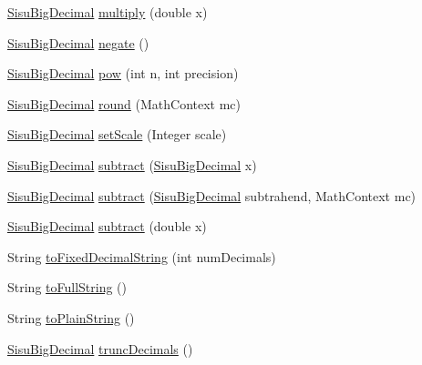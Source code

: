 \begin{DoxyCompactItemize}
\item 
\hyperlink{classcom_1_1aarrelaakso_1_1drawl_1_1_sisu_big_decimal}{Sisu\+Big\+Decimal} \hyperlink{classcom_1_1aarrelaakso_1_1drawl_1_1_sisu_big_decimal_a629f43082e518f55326ca0efcffad3b5}{multiply} (double x)
\item 
\hyperlink{classcom_1_1aarrelaakso_1_1drawl_1_1_sisu_big_decimal}{Sisu\+Big\+Decimal} \hyperlink{classcom_1_1aarrelaakso_1_1drawl_1_1_sisu_big_decimal_a2d82668c01a8ec2b0b79c2a6cd63253c}{negate} ()
\item 
\hyperlink{classcom_1_1aarrelaakso_1_1drawl_1_1_sisu_big_decimal}{Sisu\+Big\+Decimal} \hyperlink{classcom_1_1aarrelaakso_1_1drawl_1_1_sisu_big_decimal_aa3be41b7881201bb4184ef30b8ee4ad9}{pow} (int n, int precision)
\item 
\hyperlink{classcom_1_1aarrelaakso_1_1drawl_1_1_sisu_big_decimal}{Sisu\+Big\+Decimal} \hyperlink{classcom_1_1aarrelaakso_1_1drawl_1_1_sisu_big_decimal_a5d192b65bffd1955bb670588ece9ba0e}{round} (Math\+Context mc)
\item 
\hyperlink{classcom_1_1aarrelaakso_1_1drawl_1_1_sisu_big_decimal}{Sisu\+Big\+Decimal} \hyperlink{classcom_1_1aarrelaakso_1_1drawl_1_1_sisu_big_decimal_a28eb72a8179d226e5bcfdbc5c2e103bf}{set\+Scale} (Integer scale)
\item 
\hyperlink{classcom_1_1aarrelaakso_1_1drawl_1_1_sisu_big_decimal}{Sisu\+Big\+Decimal} \hyperlink{classcom_1_1aarrelaakso_1_1drawl_1_1_sisu_big_decimal_a44ef5723298dfa0e8fc62506fdc059cd}{subtract} (\hyperlink{classcom_1_1aarrelaakso_1_1drawl_1_1_sisu_big_decimal}{Sisu\+Big\+Decimal} x)
\item 
\hyperlink{classcom_1_1aarrelaakso_1_1drawl_1_1_sisu_big_decimal}{Sisu\+Big\+Decimal} \hyperlink{classcom_1_1aarrelaakso_1_1drawl_1_1_sisu_big_decimal_a8a237e36134bf0cdb87c3b53b3aaa9cc}{subtract} (\hyperlink{classcom_1_1aarrelaakso_1_1drawl_1_1_sisu_big_decimal}{Sisu\+Big\+Decimal} subtrahend, Math\+Context mc)
\item 
\hyperlink{classcom_1_1aarrelaakso_1_1drawl_1_1_sisu_big_decimal}{Sisu\+Big\+Decimal} \hyperlink{classcom_1_1aarrelaakso_1_1drawl_1_1_sisu_big_decimal_abde4af9e4686abbbdb1539505f7223ae}{subtract} (double x)
\item 
String \hyperlink{classcom_1_1aarrelaakso_1_1drawl_1_1_sisu_big_decimal_aa50e4eab549ecda56977c2480674055b}{to\+Fixed\+Decimal\+String} (int num\+Decimals)
\item 
String \hyperlink{classcom_1_1aarrelaakso_1_1drawl_1_1_sisu_big_decimal_aa1fdb9a9086d8a7a0c75f7b2acbf4931}{to\+Full\+String} ()
\item 
String \hyperlink{classcom_1_1aarrelaakso_1_1drawl_1_1_sisu_big_decimal_aad76de7e2c8ced754cc3f98f53f5e692}{to\+Plain\+String} ()
\item 
\hyperlink{classcom_1_1aarrelaakso_1_1drawl_1_1_sisu_big_decimal}{Sisu\+Big\+Decimal} \hyperlink{classcom_1_1aarrelaakso_1_1drawl_1_1_sisu_big_decimal_ab81d0189bbfd5f1b69de6781ac383ac3}{trunc\+Decimals} ()
\end{DoxyCompactItemize}
